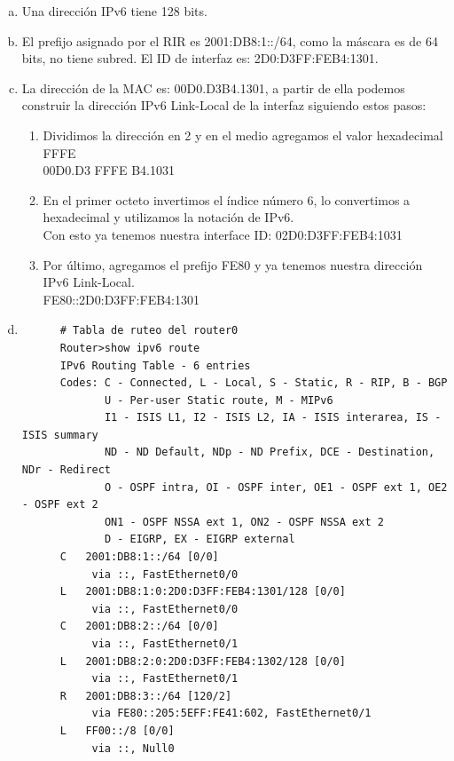 \documentclass[11pt]{article}
\begin{document}
\begin{enumerate}[a)]
  \item Una dirección IPv6 tiene 128 bits.
  \item El prefijo asignado por el RIR es 2001:DB8:1::/64, como la máscara es de 64
        bits, no tiene subred. El ID de interfaz es: 2D0:D3FF:FEB4:1301.
  \item La dirección de la MAC es: 00D0.D3B4.1301, a partir de ella podemos
        construir la dirección IPv6 Link-Local de la interfaz siguiendo estos pasos:
        \begin{enumerate}[1)]
          \item Dividimos la dirección en 2 y en el medio agregamos el valor hexadecimal FFFE \\
                00D0.D3 FFFE B4.1031
          \item En el primer octeto invertimos el índice número 6, lo convertimos a hexadecimal
                y utilizamos la notación de IPv6. \\
                Con esto ya tenemos nuestra interface ID: 02D0:D3FF:FEB4:1031
          \item Por último, agregamos el prefijo FE80 y ya tenemos nuestra dirección IPv6 Link-Local. \\
                FE80::2D0:D3FF:FEB4:1301       
        \end{enumerate}
  \item 
    \begin{verbatim}
      # Tabla de ruteo del router0
      Router>show ipv6 route
      IPv6 Routing Table - 6 entries
      Codes: C - Connected, L - Local, S - Static, R - RIP, B - BGP
             U - Per-user Static route, M - MIPv6
             I1 - ISIS L1, I2 - ISIS L2, IA - ISIS interarea, IS - ISIS summary
             ND - ND Default, NDp - ND Prefix, DCE - Destination, NDr - Redirect
             O - OSPF intra, OI - OSPF inter, OE1 - OSPF ext 1, OE2 - OSPF ext 2
             ON1 - OSPF NSSA ext 1, ON2 - OSPF NSSA ext 2
             D - EIGRP, EX - EIGRP external
      C   2001:DB8:1::/64 [0/0]
           via ::, FastEthernet0/0
      L   2001:DB8:1:0:2D0:D3FF:FEB4:1301/128 [0/0]
           via ::, FastEthernet0/0
      C   2001:DB8:2::/64 [0/0]
           via ::, FastEthernet0/1
      L   2001:DB8:2:0:2D0:D3FF:FEB4:1302/128 [0/0]
           via ::, FastEthernet0/1
      R   2001:DB8:3::/64 [120/2]
           via FE80::205:5EFF:FE41:602, FastEthernet0/1
      L   FF00::/8 [0/0]
           via ::, Null0


\end{verbatim}
\end{enumerate}
\end{document}
